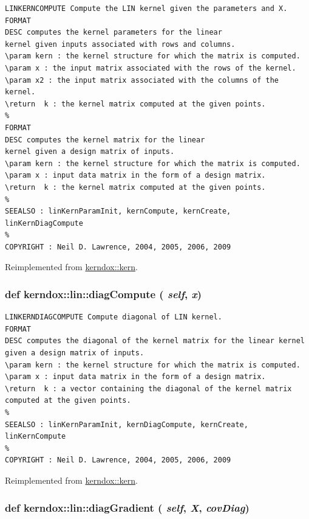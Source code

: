 \footnotesize\begin{verbatim}LINKERNCOMPUTE Compute the LIN kernel given the parameters and X.
FORMAT
DESC computes the kernel parameters for the linear
kernel given inputs associated with rows and columns.
\param kern : the kernel structure for which the matrix is computed.
\param x : the input matrix associated with the rows of the kernel.
\param x2 : the input matrix associated with the columns of the kernel.
\return  k : the kernel matrix computed at the given points.
%
FORMAT
DESC computes the kernel matrix for the linear
kernel given a design matrix of inputs.
\param kern : the kernel structure for which the matrix is computed.
\param x : input data matrix in the form of a design matrix.
\return  k : the kernel matrix computed at the given points.
%
SEEALSO : linKernParamInit, kernCompute, kernCreate, linKernDiagCompute
%
COPYRIGHT : Neil D. Lawrence, 2004, 2005, 2006, 2009

\end{verbatim}
\normalsize
 

Reimplemented from \hyperlink{classkerndox_1_1kern}{kerndox::kern}.\hypertarget{classkerndox_1_1lin_0031e74c9acb34a68479ade5f62aa8e3}{
\subsubsection[{diagCompute}]{\setlength{\rightskip}{0pt plus 5cm}def kerndox::lin::diagCompute ( {\em self}, \/   {\em x})}}
\label{classkerndox_1_1lin_0031e74c9acb34a68479ade5f62aa8e3}




\footnotesize\begin{verbatim}LINKERNDIAGCOMPUTE Compute diagonal of LIN kernel.
FORMAT
DESC computes the diagonal of the kernel matrix for the linear kernel given a design matrix of inputs.
\param kern : the kernel structure for which the matrix is computed.
\param x : input data matrix in the form of a design matrix.
\return  k : a vector containing the diagonal of the kernel matrix
computed at the given points.
%
SEEALSO : linKernParamInit, kernDiagCompute, kernCreate, linKernCompute
%
COPYRIGHT : Neil D. Lawrence, 2004, 2005, 2006, 2009

\end{verbatim}
\normalsize
 

Reimplemented from \hyperlink{classkerndox_1_1kern}{kerndox::kern}.\hypertarget{classkerndox_1_1lin_a86845028577e7d1bed2496250d79d36}{
\subsubsection[{diagGradient}]{\setlength{\rightskip}{0pt plus 5cm}def kerndox::lin::diagGradient ( {\em self}, \/   {\em X}, \/   {\em covDiag})}}
\label{classkerndox_1_1lin_a86845028577e7d1bed2496250d79d36}




